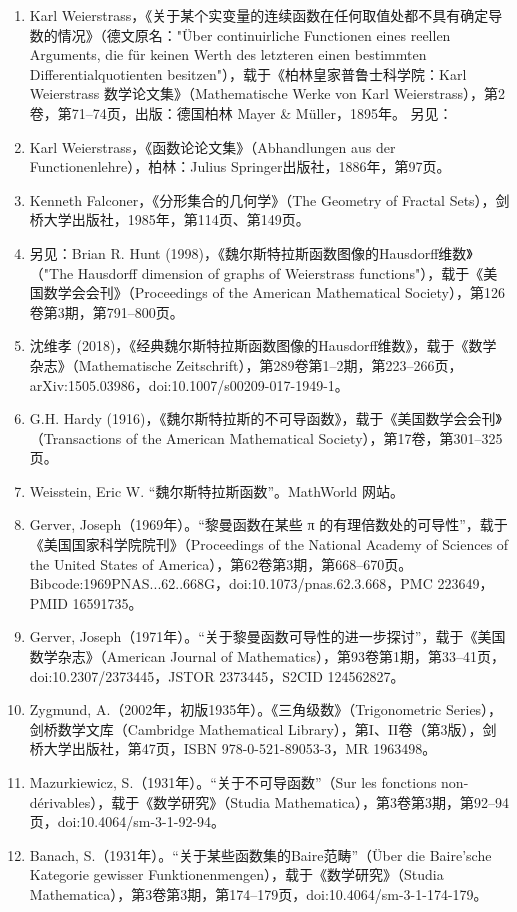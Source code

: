 \begin{enumerate}
\item Karl Weierstrass，《关于某个实变量的连续函数在任何取值处都不具有确定导数的情况》（德文原名："Über continuirliche Functionen eines reellen Arguments, die für keinen Werth des letzteren einen bestimmten Differentialquotienten besitzen"），载于《柏林皇家普鲁士科学院：Karl Weierstrass 数学论文集》（Mathematische Werke von Karl Weierstrass），第2卷，第71–74页，出版：德国柏林 Mayer & Müller，1895年。
另见：
\item Karl Weierstrass，《函数论论文集》（Abhandlungen aus der Functionenlehre），柏林：Julius Springer出版社，1886年，第97页。
\item Kenneth Falconer，《分形集合的几何学》（The Geometry of Fractal Sets），剑桥大学出版社，1985年，第114页、第149页。
\item 另见：Brian R. Hunt (1998)，《魏尔斯特拉斯函数图像的Hausdorff维数》（"The Hausdorff dimension of graphs of Weierstrass functions"），载于《美国数学会会刊》（Proceedings of the American Mathematical Society），第126卷第3期，第791–800页。
\item 沈维孝 (2018)，《经典魏尔斯特拉斯函数图像的Hausdorff维数》，载于《数学杂志》（Mathematische Zeitschrift），第289卷第1–2期，第223–266页，arXiv:1505.03986，doi:10.1007/s00209-017-1949-1。
\item G.H. Hardy (1916)，《魏尔斯特拉斯的不可导函数》，载于《美国数学会会刊》（Transactions of the American Mathematical Society），第17卷，第301–325页。
\item Weisstein, Eric W. “魏尔斯特拉斯函数”。MathWorld 网站。
\item Gerver, Joseph（1969年）。“黎曼函数在某些 π 的有理倍数处的可导性”，载于《美国国家科学院院刊》（Proceedings of the National Academy of Sciences of the United States of America），第62卷第3期，第668–670页。Bibcode:1969PNAS...62..668G，doi:10.1073/pnas.62.3.668，PMC 223649，PMID 16591735。
\item Gerver, Joseph（1971年）。“关于黎曼函数可导性的进一步探讨”，载于《美国数学杂志》（American Journal of Mathematics），第93卷第1期，第33–41页，doi:10.2307/2373445，JSTOR 2373445，S2CID 124562827。
\item Zygmund, A.（2002年，初版1935年）。《三角级数》（Trigonometric Series），剑桥数学文库（Cambridge Mathematical Library），第I、II卷（第3版），剑桥大学出版社，第47页，ISBN 978-0-521-89053-3，MR 1963498。
\item Mazurkiewicz, S.（1931年）。“关于不可导函数”（Sur les fonctions non-dérivables），载于《数学研究》（Studia Mathematica），第3卷第3期，第92–94页，doi:10.4064/sm-3-1-92-94。
\item Banach, S.（1931年）。“关于某些函数集的Baire范畴”（Über die Baire'sche Kategorie gewisser Funktionenmengen），载于《数学研究》（Studia Mathematica），第3卷第3期，第174–179页，doi:10.4064/sm-3-1-174-179。
\end{enumerate}
